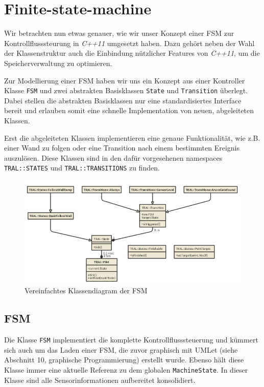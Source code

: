 \section{Finite-state-machine}
\label{sec:fsm}
Wir betrachten nun etwas genauer, wie wir unser Konzept einer FSM zur 
Kontrollflusssteurung in \textit{C++11} umgesetzt haben. Dazu gehört neben der Wahl 
der Klassenstruktur auch die Einbindung nützlicher Features von \textit{C++11}, um die
Speicherverwaltung zu optimieren.

Zur Modellierung einer FSM haben wir uns ein Konzept aus einer Kontroller Klasse \texttt{FSM} und zwei abstrakten Basisklassen \texttt{State} und \texttt{Transition} überlegt. Dabei stellen die abstrakten Basisklassen nur eine standardisiertes Interface bereit und erlauben somit eine schnelle Implementation von neuen, abgeleiteten Klassen.


Erst die abgeleiteten Klassen implementieren eine genaue Funktionalität, wie z.B. einer Wand zu folgen oder eine Transition nach einem bestimmten Ereignis auszulösen. Diese Klassen sind in den dafür vorgesehenen namespaces \texttt{TRAL::STATES} und \texttt{TRAL::TRANSITIONS} zu finden.

\begin{figure}[htbp] 
  \centering
     \includegraphics[width=\textwidth]{images/fsm-uml.png}
  \caption{Vereinfachtes Klassendiagram der FSM}
  \label{fig:KlassendiagramFSM}
\end{figure}

\subsection{FSM}
Die Klasse \texttt{FSM} implementiert die komplette Kontrollflusssteuerung und kümmert sich auch um das Laden einer FSM, die zuvor graphisch mit UMLet (siehe Abschnitt 10, graphische Programmierung) erstellt wurde. Ebenso hält diese Klasse immer eine aktuelle Referenz zu dem globalen \texttt{MachineState}. In dieser Klasse sind alle Sensorinformationen aufbereitet konsolidiert.

